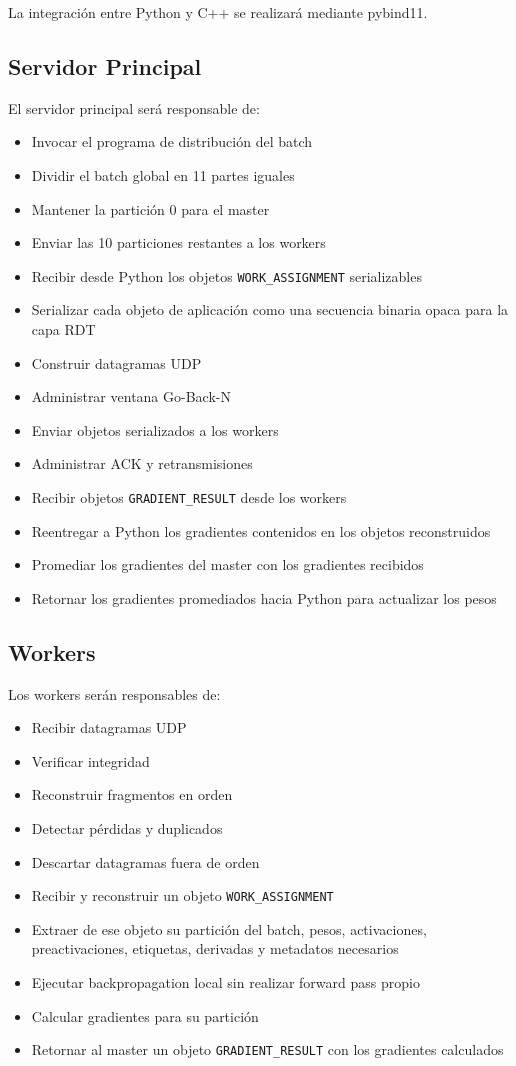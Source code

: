 \documentclass[12pt]{article}
\begin{document}
La integración entre Python y C++ se realizará mediante pybind11.

\subsection{Servidor Principal}

El servidor principal será responsable de:

\begin{itemize}
\item Invocar el programa de distribución del batch
\item Dividir el batch global en 11 partes iguales
\item Mantener la partición 0 para el master
\item Enviar las 10 particiones restantes a los workers
\item Recibir desde Python los objetos \texttt{WORK\_ASSIGNMENT} serializables
\item Serializar cada objeto de aplicación como una secuencia binaria opaca para la capa RDT
\item Construir datagramas UDP
\item Administrar ventana Go-Back-N
\item Enviar objetos serializados a los workers
\item Administrar ACK y retransmisiones
\item Recibir objetos \texttt{GRADIENT\_RESULT} desde los workers
\item Reentregar a Python los gradientes contenidos en los objetos reconstruidos
\item Promediar los gradientes del master con los gradientes recibidos
\item Retornar los gradientes promediados hacia Python para actualizar los pesos
\end{itemize}

\subsection{Workers}

Los workers serán responsables de:

\begin{itemize}
\item Recibir datagramas UDP
\item Verificar integridad
\item Reconstruir fragmentos en orden
\item Detectar pérdidas y duplicados
\item Descartar datagramas fuera de orden
\item Recibir y reconstruir un objeto \texttt{WORK\_ASSIGNMENT}
\item Extraer de ese objeto su partición del batch, pesos, activaciones, preactivaciones, etiquetas, derivadas y metadatos necesarios
\item Ejecutar backpropagation local sin realizar forward pass propio
\item Calcular gradientes para su partición
\item Retornar al master un objeto \texttt{GRADIENT\_RESULT} con los gradientes calculados
\end{itemize}
\end{document}
